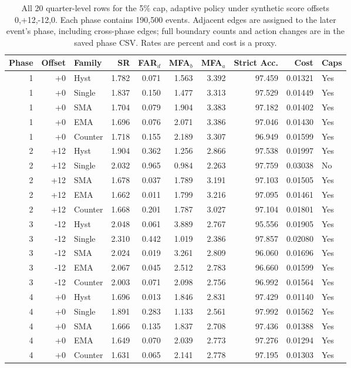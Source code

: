 \begin{table}[!htbp]
\centering
\caption{All 20 quarter-level rows for the 5\% cap, adaptive policy under synthetic score offsets 0,+12,-12,0. Each phase contains 190,500 events. Adjacent edges are assigned to the later event's phase, including cross-phase edges; full boundary counts and action changes are in the saved phase CSV. Rates are percent and cost is a proxy.}
\label{tab:supp_shift_phase_5_adaptive}
\scriptsize
\setlength{\tabcolsep}{2.6pt}
\begin{tabular}{rrlrrrrrrl}
\toprule
Phase & Offset & Family & SR & FAR$_d$ & MFA$_b$ & MFA$_a$ & Strict Acc. & Cost & Caps\\
\midrule
1 & +0 & Hyst & 1.782 & 0.071 & 1.563 & 3.392 & 97.459 & 0.01321 & Yes \\
1 & +0 & Single & 1.837 & 0.150 & 1.477 & 3.313 & 97.529 & 0.01449 & Yes \\
1 & +0 & SMA & 1.704 & 0.079 & 1.904 & 3.383 & 97.182 & 0.01402 & Yes \\
1 & +0 & EMA & 1.696 & 0.076 & 2.071 & 3.386 & 97.046 & 0.01430 & Yes \\
1 & +0 & Counter & 1.718 & 0.155 & 2.189 & 3.307 & 96.949 & 0.01599 & Yes \\
2 & +12 & Hyst & 1.904 & 0.362 & 1.256 & 2.866 & 97.538 & 0.01997 & Yes \\
2 & +12 & Single & 2.032 & 0.965 & 0.984 & 2.263 & 97.759 & 0.03038 & No \\
2 & +12 & SMA & 1.678 & 0.037 & 1.789 & 3.191 & 97.103 & 0.01505 & Yes \\
2 & +12 & EMA & 1.662 & 0.011 & 1.799 & 3.216 & 97.095 & 0.01461 & Yes \\
2 & +12 & Counter & 1.668 & 0.201 & 1.787 & 3.027 & 97.104 & 0.01801 & Yes \\
3 & -12 & Hyst & 2.048 & 0.061 & 3.889 & 2.767 & 95.556 & 0.01905 & Yes \\
3 & -12 & Single & 2.310 & 0.442 & 1.019 & 2.386 & 97.857 & 0.02080 & Yes \\
3 & -12 & SMA & 2.024 & 0.019 & 3.261 & 2.809 & 96.060 & 0.01696 & Yes \\
3 & -12 & EMA & 2.067 & 0.045 & 2.512 & 2.783 & 96.660 & 0.01599 & Yes \\
3 & -12 & Counter & 2.003 & 0.071 & 2.098 & 2.756 & 96.992 & 0.01564 & Yes \\
4 & +0 & Hyst & 1.696 & 0.013 & 1.846 & 2.831 & 97.429 & 0.01140 & Yes \\
4 & +0 & Single & 1.891 & 0.283 & 1.133 & 2.561 & 97.992 & 0.01562 & Yes \\
4 & +0 & SMA & 1.666 & 0.135 & 1.837 & 2.708 & 97.436 & 0.01388 & Yes \\
4 & +0 & EMA & 1.649 & 0.070 & 2.039 & 2.773 & 97.276 & 0.01294 & Yes \\
4 & +0 & Counter & 1.631 & 0.065 & 2.141 & 2.778 & 97.195 & 0.01303 & Yes \\
\bottomrule
\end{tabular}
\end{table}

